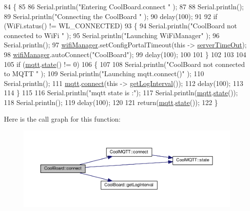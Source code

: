 \begin{DoxyCode}
84 \{
85     
86     Serial.println(\textcolor{stringliteral}{"Entering CoolBoard.connect "} );
87 
88     Serial.println();
89     Serial.println(\textcolor{stringliteral}{"Connecting the CoolBoard  "} );
90     delay(100);
91 
92     \textcolor{keywordflow}{if} (WiFi.status() != WL\_CONNECTED)
93     \{       
94         Serial.println(\textcolor{stringliteral}{"CoolBoard not connected to WiFi "} );
95         Serial.println(\textcolor{stringliteral}{"Launching WiFiManager"} );
96         Serial.println();
97         \hyperlink{classCoolBoard_a55b28656e295140928557c47d7fff01e}{wifiManager}.setConfigPortalTimeout(\textcolor{keyword}{this} -> \hyperlink{classCoolBoard_a7a8d8d3d316220cdd049cd63c1aa8fe6}{serverTimeOut});
98         \hyperlink{classCoolBoard_a55b28656e295140928557c47d7fff01e}{wifiManager}.autoConnect(\textcolor{stringliteral}{"CoolBoard"});
99         delay(100);
100 
101     \}
102 
103 
104     
105     \textcolor{keywordflow}{if} (\hyperlink{classCoolBoard_a2399f44d7c23c1149a335cb3b46d90f1}{mqtt}.\hyperlink{classCoolMQTT_a5d003307eff78efbd585e42b43b72b6d}{state}() != 0)
106     \{   
107             
108         Serial.println(\textcolor{stringliteral}{"CoolBoard not connected to MQTT "} );
109         Serial.println(\textcolor{stringliteral}{"Launching mqtt.connect()"} );
110         Serial.println();
111         \hyperlink{classCoolBoard_a2399f44d7c23c1149a335cb3b46d90f1}{mqtt}.\hyperlink{classCoolMQTT_a58b0b1f64b269c2681685208262fba1d}{connect}(\textcolor{keyword}{this} -> \hyperlink{classCoolBoard_aaa24480b273fc095a1356a589c333781}{getLogInterval}());
112         delay(100);
113         
114     \}
115 
116     Serial.println(\textcolor{stringliteral}{"mqtt state is :"});
117     Serial.println(\hyperlink{classCoolBoard_a2399f44d7c23c1149a335cb3b46d90f1}{mqtt}.\hyperlink{classCoolMQTT_a5d003307eff78efbd585e42b43b72b6d}{state}());
118     Serial.println();
119     delay(100);
120 
121     \textcolor{keywordflow}{return}(\hyperlink{classCoolBoard_a2399f44d7c23c1149a335cb3b46d90f1}{mqtt}.\hyperlink{classCoolMQTT_a5d003307eff78efbd585e42b43b72b6d}{state}());
122 \}
\end{DoxyCode}
Here is the call graph for this function\+:
\nopagebreak
\begin{figure}[H]
\begin{center}
\leavevmode
\includegraphics[width=350pt]{classCoolBoard_a519de78b807f8ec6463ff484eb925918_cgraph}
\end{center}
\end{figure}
\mbox{\label{classCoolBoard_aaa24480b273fc095a1356a589c333781}} 

